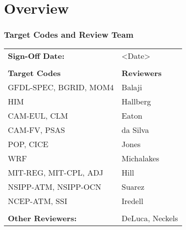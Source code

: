 \part{\longname Overview}

\section{Target Codes and Review Team}

\begin{tabular}{l l}

{\bf Sign-Off Date:}          & <Date> \\ \\

{\bf Target Codes}            & {\bf Reviewers} \\
GFDL-SPEC, BGRID, MOM4        & Balaji \\ 
HIM                           & Hallberg \\
CAM-EUL, CLM                  & Eaton \\
CAM-FV, PSAS                  & da Silva\\
POP, CICE                     & Jones \\
WRF                           & Michalakes \\
MIT-REG, MIT-CPL, ADJ         & Hill \\
NSIPP-ATM, NSIPP-OCN          & Suarez \\
NCEP-ATM, SSI                 & Iredell \\ \\

{\bf Other Reviewers:}        & DeLuca, Neckels

\end{tabular}


%



